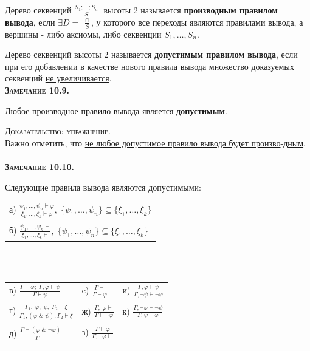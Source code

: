 \documentclass[18pt, a4paper]{extarticle}
\newcommand{\ampersand}{\;\&\;}
\begin{document}
Дерево секвенций $\displaystyle \frac{S_1;\dots;S_n}{S}\;$ высоты 2 называется \textbf{производным правилом вывода}, если $\exists D =\;\displaystyle \frac{\cap}{S}$, у которого все переходы являются правилами вывода, а вершины - либо аксиомы, либо секвенции $S_1,\dots,S_n$.

Дерево секвенций высоты 2 называется \textbf{допустимым правилом вывода}, если при его добавлении в качестве нового правила вывода множество доказуемых секвенций \underline{не увеличивается}.\\

\textbf{\textsc{Замечание 10.9.}} 

Любое производное правило вывода является \textbf{допустимым}.

\textsc{Доказательство: упражнение.} \\

Важно отметить, что \underline{не любое допустимое правило вывода будет произво}-\underline{дным}.\\\\

\textbf{\textsc{Замечание 10.10.}} 

Следующие правила вывода являются допустимыми:\\

\begin{tabular}{l}
а) $\displaystyle \frac{\psi_1,\dots,\psi_n \vdash \varphi}{\xi_1,\dots,\xi_k \vdash \varphi},\;\{\psi_1,\dots,\psi_n\} \subseteq \{\xi_1,\dots,\xi_k\}$\\\\

б) $\displaystyle \frac{\psi_1,\dots,\psi_n \vdash }{\xi_1,\dots,\xi_k \vdash},\;\{\psi_1,\dots,\psi_n\} \subseteq \{\xi_1,\dots,\xi_k\}$
\end{tabular}\leavevmode\\\\

\begin{tabular}{lll}
в) $\displaystyle \frac{\Gamma \vdash \varphi;\;\Gamma, \varphi \vdash \psi }{\Gamma \vdash \psi}$ \qquad& e) $\displaystyle \frac{\Gamma \vdash}{\Gamma \vdash \varphi}$ \qquad & и) $\displaystyle \frac{\Gamma, \varphi\vdash\psi}{\Gamma,\lnot\psi\vdash\lnot\varphi}$\\\\

г) $\displaystyle \frac{\Gamma_1,\;\varphi,\;\psi,\;\Gamma_2 \vdash \xi}{\Gamma_1, (\varphi\ampersand\psi), \Gamma_2 \vdash \xi}$ \qquad & ж) $\displaystyle \frac{\Gamma,\;\varphi\vdash}{\Gamma\vdash\lnot\varphi}$ \qquad & к) $\displaystyle \frac{\Gamma,\lnot\varphi\vdash\lnot\psi}{\Gamma,\psi\vdash\varphi}$\\\\

д) $\displaystyle \frac{\Gamma \vdash (\varphi\ampersand\lnot\varphi)}{\Gamma\vdash}$ \qquad & з) $\displaystyle \frac{\Gamma\vdash\varphi}{\Gamma,\lnot\varphi\vdash}$ & \\\\
\end{tabular}\leavevmode\\
\end{document}

